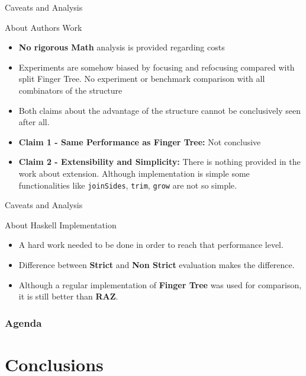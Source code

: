 \documentclass{beamer}
\begin{document}
\begin{frame}[fragile]{Caveats and Analysis}

  \begin{block}{About Authors Work}
    \begin{itemize}
    \item \textbf{No rigorous Math} analysis is provided regarding costs
    \item Experiments are somehow biased by focusing and refocusing compared with split Finger Tree. No experiment or benchmark comparison with all combinators of the structure
    \item Both claims about the advantage of the structure cannot be conclusively seen after all.
    \item \textbf{Claim 1 - Same Performance as Finger Tree:} Not conclusive
    \item \textbf{Claim 2 - Extensibility and Simplicity:} There is nothing provided in the work about extension. Although implementation is simple some functionalities like \texttt{joinSides}, \texttt{trim}, \texttt{grow} are not so simple.
  \end{itemize}
  \end{block}

\end{frame}

\begin{frame}[fragile]{Caveats and Analysis}

  \begin{block}{About Haskell Implementation}
    \begin{itemize}
      \item A hard work needed to be done in order to reach that performance level.
      \item Difference between \textbf{Strict} and \textbf{Non Strict} evaluation makes the difference.
      \item Although a regular implementation of \textbf{Finger Tree} was used for comparison, it is still better than \textbf{RAZ}.
  \end{itemize}
  \end{block}

\end{frame}



\begin{frame}
  \frametitle{Agenda}
  \section{Conclusions}
  \tableofcontents[currentsection]
\end{frame}
\end{document}
